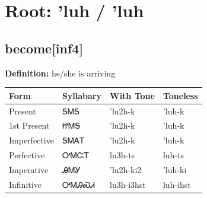 \documentclass{article}%
\begin{document}
%
\normalsize%
\section*{Root: 'luh / 'luh}%
\subsection*{become[inf4]}%
\textbf{Definition: }%
he/she is arriving%
\\[0.5em]%
\begin{tabular}{|l|l|l|l|}%
\hline%
\textbf{Form}&\textbf{Syllabary}&\textbf{With Tone}&\textbf{Toneless}\\%
\hline%
Present&ᎦᎷᎦ&'lu2h{-}k&'luh{-}k\\%
1st Present&ᏥᎷᎦ&'lu2h{-}k&'luh{-}k\\%
Imperfective&ᎦᎷᎪᎢ&'lu2h{-}k&'luh{-}k\\%
Perfective&ᎤᎷᏨᎢ&lu3h{-}ts&luh{-}ts\\%
Imperative&ᎯᎷᎩ&'lu2h{-}ki2&'luh{-}ki\\%
Infinitive&ᎤᎷᎯᏍᏗ&lu3h{-}i3hst&luh{-}ihst\\%
\hline%
\end{tabular}%
\\[1em]%
\end{document}
